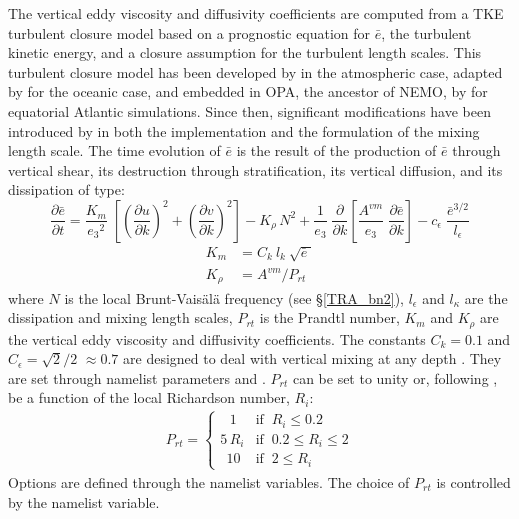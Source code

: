 \documentclass[NEMO_book]{subfiles}
\begin{document}
The vertical eddy viscosity and diffusivity coefficients are computed from a TKE 
turbulent closure model based on a prognostic equation for $\bar{e}$, the turbulent 
kinetic energy, and a closure assumption for the turbulent length scales. This 
turbulent closure model has been developed by \citet{Bougeault1989} in the 
atmospheric case, adapted by \citet{Gaspar1990} for the oceanic case, and 
embedded in OPA, the ancestor of NEMO, by \citet{Blanke1993} for equatorial Atlantic 
simulations. Since then, significant modifications have been introduced by 
\citet{Madec1998} in both the implementation and the formulation of the mixing 
length scale. The time evolution of $\bar{e}$ is the result of the production of 
$\bar{e}$ through vertical shear, its destruction through stratification, its vertical 
diffusion, and its dissipation of \citet{Kolmogorov1942} type:
\begin{equation} \label{Eq_zdftke_e}
\frac{\partial \bar{e}}{\partial t} = 
\frac{K_m}{{e_3}^2 }\;\left[ {\left( {\frac{\partial u}{\partial k}} \right)^2
				        +\left( {\frac{\partial v}{\partial k}} \right)^2} \right]
-K_\rho\,N^2
+\frac{1}{e_3}	\;\frac{\partial }{\partial k}\left[ {\frac{A^{vm}}{e_3 }
				\;\frac{\partial \bar{e}}{\partial k}} \right]
- c_\epsilon \;\frac{\bar {e}^{3/2}}{l_\epsilon }
\end{equation}
\begin{equation} \label{Eq_zdftke_kz}
   \begin{split}
         K_m &= C_k\  l_k\  \sqrt {\bar{e}\; }  	\\
         K_\rho &= A^{vm} / P_{rt}
   \end{split}
\end{equation}
where $N$ is the local Brunt-Vais\"{a}l\"{a} frequency (see \S\ref{TRA_bn2}), 
$l_{\epsilon }$ and $l_{\kappa }$ are the dissipation and mixing length scales, 
$P_{rt}$ is the Prandtl number, $K_m$ and $K_\rho$ are the vertical eddy viscosity 
and diffusivity coefficients. The constants $C_k =  0.1$ and $C_\epsilon = \sqrt {2} /2$  
$\approx 0.7$ are designed to deal with vertical mixing at any depth \citep{Gaspar1990}. 
They are set through namelist parameters  and . 
$P_{rt}$ can be set to unity or, following \citet{Blanke1993}, be a function 
of the local Richardson number, $R_i$:
\begin{align*} \label{Eq_prt}
P_{rt} = \begin{cases}
                    \ \ \ 1 &      \text{if $\ R_i \leq 0.2$} 	\\
                    5\,R_i &      \text{if $\ 0.2 \leq R_i \leq 2$} 	\\
                    \ \ 10 &      \text{if $\ 2 \leq R_i$} 
            \end{cases}
\end{align*}
Options are defined through the   namelist variables.
The choice of $P_{rt}$ is controlled by the  namelist variable.
\end{document}
